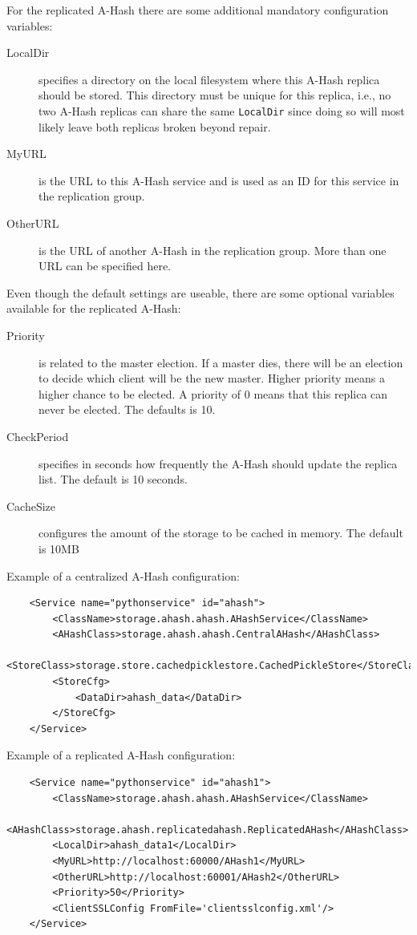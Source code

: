 \documentclass{book}
\begin{document}
For the replicated A-Hash there are some additional mandatory configuration variables:

\begin{description}
    \item[LocalDir] specifies a directory on the local filesystem where this A-Hash replica should be stored. This directory must be unique for this replica, i.e., no two A-Hash replicas can share the same \verb!LocalDir! since doing so will most likely leave both replicas broken beyond repair.
    \item[MyURL] is the URL to this A-Hash service and is used as an ID for this service in the replication group.
    \item[OtherURL] is the URL of another A-Hash in the replication group. More than one URL can be specified here.
\end{description}

Even though the default settings are useable, there are some optional variables available for the replicated A-Hash:
\begin{description}
    \item[Priority] is related to the master election. If a master dies, there will be an election to decide which client will be the new master. Higher priority means a higher chance to be elected. A priority of 0 means that this replica can never be elected. The defaults is 10.
    \item[CheckPeriod] specifies in seconds how frequently the A-Hash should update the replica list. The default is 10 seconds.
    \item[CacheSize] configures the amount of the storage to be cached in memory. The default is 10MB
\end{description}


Example of a centralized A-Hash configuration:

\begin{verbatim}
    <Service name="pythonservice" id="ahash">
        <ClassName>storage.ahash.ahash.AHashService</ClassName>
        <AHashClass>storage.ahash.ahash.CentralAHash</AHashClass>
        <StoreClass>storage.store.cachedpicklestore.CachedPickleStore</StoreClass>
        <StoreCfg>
            <DataDir>ahash_data</DataDir>
        </StoreCfg>
    </Service>
\end{verbatim}

Example of a replicated A-Hash configuration:
\begin{verbatim}
    <Service name="pythonservice" id="ahash1">
        <ClassName>storage.ahash.ahash.AHashService</ClassName>
        <AHashClass>storage.ahash.replicatedahash.ReplicatedAHash</AHashClass>
        <LocalDir>ahash_data1</LocalDir>
        <MyURL>http://localhost:60000/AHash1</MyURL>
        <OtherURL>http://localhost:60001/AHash2</OtherURL>
        <Priority>50</Priority>
        <ClientSSLConfig FromFile='clientsslconfig.xml'/>
    </Service>
\end{verbatim}
\end{document}
